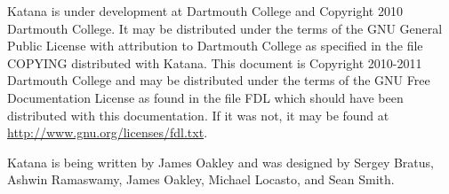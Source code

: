 \documentclass[11pt]{article}
\begin{document}
  Katana is under development at Dartmouth College and Copyright 2010
  Dartmouth College. It may be distributed under the terms of the GNU
  General Public License with attribution to Dartmouth College as
  specified in the file COPYING distributed with Katana. This document
  is Copyright 2010-2011 Dartmouth College and may be distributed
  under the terms of the GNU Free Documentation License as found in
  the file FDL which should have been distributed with this
  documentation. If it was not, it may be found at
  \href{http://www.gnu.org/licenses/fdl.txt}{http://www.gnu.org/licenses/fdl.txt}.

  Katana is being written by James Oakley and was designed by Sergey
  Bratus, Ashwin Ramaswamy, James Oakley, Michael Locasto, and Sean
  Smith.
\end{document}
